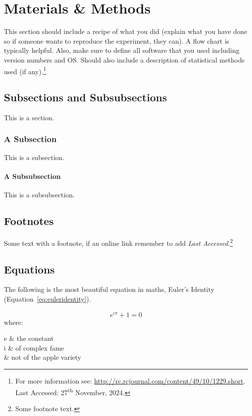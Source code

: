 \chapter{Materials \& Methods}

This section should include a recipe of what you did (explain what you have done so if someone wants to reproduce the experiment, they can).  A flow chart is typically helpful.  Also, make sure to define all software that you used including version numbers and OS.  Should also include a description of statistical methods used (if any).\footnote{For more information see: \url{http://rc.rcjournal.com/content/49/10/1229.short}. Last Accessed: 27\textsuperscript{th} November, 2024.}

\blindtext

\section{Subsections and Subsubsections}

This is a section.

\subsection{A Subsection}

This is a subsection.

\subsubsection{A Subsubsection}

This is a subsubsection.

\section{Footnotes}

Some text with a footnote, if an online link remember to add \textit{Last Accessed}.\footnote{Some footnote text.}

\section{Equations}

The following is the most beautiful equation in maths, Euler's Identity (Equation~\ref{eq:euleridentity}).

\begin{equation}\label{eq:euleridentity}
	e^{i\pi}+1=0
\end{equation}
where:
\begin{conditionsenv*}
	e 		& the constant \\
	i 		& of complex fame \\
	\pi		& not of the apple variety \\
\end{conditionsenv*}

